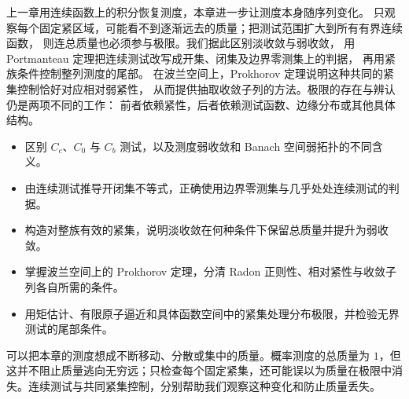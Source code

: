 
\begin{chapterabstract}
上一章用连续函数上的积分恢复测度，本章进一步让测度本身随序列变化。
只观察每个固定紧区域，可能看不到逐渐远去的质量；把测试范围扩大到所有有界连续函数，
则连总质量也必须参与极限。我们据此区别淡收敛与弱收敛，
用 Portmanteau 定理把连续测试改写成开集、闭集及边界零测集上的判据，
再用紧族条件控制整列测度的尾部。
在波兰空间上，Prokhorov 定理说明这种共同的紧集控制恰好对应相对弱紧性，
从而提供抽取收敛子列的方法。极限的存在与辨认仍是两项不同的工作：
前者依赖紧性，后者依赖测试函数、边缘分布或其他具体结构。
\end{chapterabstract}

\begin{learninggoals}
\begin{itemize}
\item\label{b1:item:12-goal-tests}区别 \(C_c\)、\(C_0\) 与 \(C_b\) 测试，以及测度弱收敛和 Banach 空间弱拓扑的不同含义。
\item\label{b1:item:12-goal-portmanteau}由连续测试推导开闭集不等式，正确使用边界零测集与几乎处处连续测试的判据。
\item\label{b1:item:12-goal-tightness}构造对整族有效的紧集，说明淡收敛在何种条件下保留总质量并提升为弱收敛。
\item\label{b1:item:12-goal-prokhorov}掌握波兰空间上的 Prokhorov 定理，分清 Radon 正则性、相对紧性与收敛子列各自所需的条件。
\item\label{b1:item:12-goal-applications}用矩估计、有限原子逼近和具体函数空间中的紧集处理分布极限，并检验无界测试的尾部条件。
\end{itemize}
\end{learninggoals}

可以把本章的测度想成不断移动、分散或集中的质量。概率测度的总质量为 \(1\)，但这并不阻止质量逃向无穷远；只检查每个固定紧集，还可能误以为质量在极限中消失。连续测试与共同紧集控制，分别帮助我们观察这种变化和防止质量丢失。

